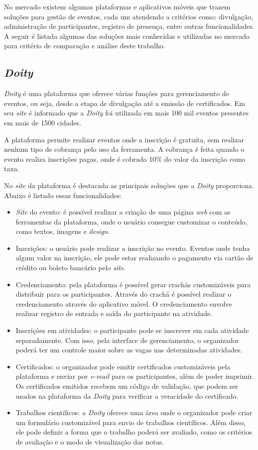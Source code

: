 No mercado existem algumas plataformas e aplicativos móveis que trazem soluções para gestão de eventos, cada um atendendo a critérios como: divulgação, administração de participantes, registro de presença, entre outras funcionalidades. A seguir é listada algumas das soluções mais conhecidas e utilizadas no mercado para critério de comparação e análise deste trabalho.

\subsection{\textit{Doity}}

\textit{Doity} é uma plataforma que oferece várias funções para gerenciamento de eventos, ou seja, desde a etapa de divulgação até a emissão de certificados. Em seu \textit{site} é informado que a \textit{Doity} foi utilizada em mais 100 mil eventos presentes em mais de 1500 cidades. 

A plataforma permite realizar eventos onde a inscrição é gratuita, sem realizar nenhum tipo de cobrança pelo uso da ferramenta. A cobrança é feita quando o evento realiza inscrições pagas, onde é cobrado 10\% do valor da inscrição como taxa.

No \textit{site} da plataforma é destacada as principais soluções que a \textit{Doity} proporciona. Abaixo é listado essas funcionalidades:

\begin{itemize}
    \item \textit{Site} do evento: é possível realizar a criação de uma página \textit{web} com as ferramentas da plataforma, onde o usuário consegue customizar o conteúdo, como textos, imagens e \textit{design}.
    \item Inscrições: o usuário pode realizar a inscrição no evento. Eventos onde tenha algum valor na inscrição, ele pode estar realizando o pagamento via cartão de crédito ou boleto bancário pelo \textit{site}.
    \item Credenciamento: pela plataforma é possível gerar crachás customizáveis para distribuir para os participantes. Através do crachá é possível realizar o credenciamento através do aplicativo móvel. O credenciamento envolve realizar registro de entrada e saída do participante na atividade.
    \item Inscrições em atividades: o participante pode se inscrever em cada atividade separadamente. Com isso, pela interface de gerenciamento, o organizador poderá ter um controle maior sobre as vagas nas determinadas atividades.
    \item Certificados: o organizador pode emitir certificados customizáveis pela plataforma e enviar por \textit{e-mail} para os participantes, além de poder imprimir. Os certificados emitidos recebem um código de validação, que podem ser usados na plataforma da \textit{Doity} para verificar a veracidade do certificado.
    \item Trabalhos científicos: a \textit{Doity} oferece uma área onde o organizador pode criar um formulário customizável para envio de trabalhos científicos. Além disso, ele pode definir a forma que o trabalho poderá ser avaliado, como os critérios de avaliação e o modo de visualização das notas.
\end{itemize}

